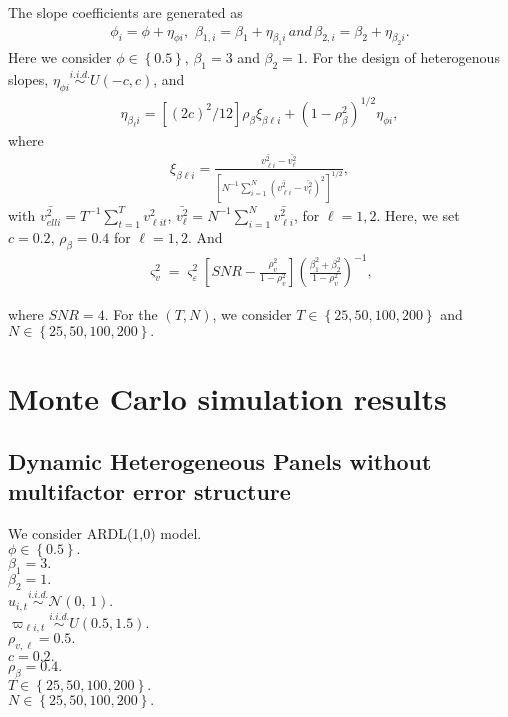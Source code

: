 \documentclass[12pt,a4paper,hyperref]{article}
\begin{document}
The slope coefficients are generated as
\begin{align}
\phi_{i}=\phi+\eta_{\phi i},\,\, \beta_{1,i}=\beta_{1}+\eta_{\beta_{1} i}\, and\, \beta_{2,i}=\beta_{2}+\eta_{\beta_{2}i}.
\end{align}
Here we consider $\phi \in \left\{0.5\right\}$, $\beta_{1}=3$ and $\beta_{2}=1$. For the design of heterogenous slopes, $\eta_{\phi i} \overset{i.i.d.}{\sim} U\left( -c, c\right)$, and
\begin{align}
\eta_{\beta_{\ell}i}=\left[(2c)^{2}/12 \right]\rho_{\beta}\xi_{\beta \ell i}+ \left(1-\rho^{2}_{\beta}  \right)^{1/2}\eta_{\phi i},
\end{align}
where
\begin{align}
\xi_{\beta \ell i}=\frac{\bar{v^{2}_{\ell i}}- \bar{v^{2}_{\ell}}}{\left[ N^{-1}\sum^{N}_{i=1} \left( \bar{v^{2}_{\ell i}}- \bar{v^{2}_{\ell }}\right)^{2} \right]^{1/2} },
\end{align}
with $\bar{v^{2}_{ell i}}=T^{-1}\sum^{T}_{t=1}v^{2}_{\ell i t}$, $\bar{v^{2}_{\ell}}=N^{-1} \sum^{N}_{i=1} \bar{v^{2}_{\ell i}}$, for $\ell=1,2.$
Here, we set $c=0.2,\, \rho_{\beta}=0.4$ for $\ell=1,2.$ And
\begin{align}
\varsigma^{2}_{v}=\varsigma^{2}_{\varepsilon}\left[SNR-\frac{\rho^{2}_{v}}{1-\rho^{2}_{v}}   \right]\left(\frac{\beta^{2}_{1}+\beta^{2}_{2}}{1-\rho^{2}_{v}}  \right)^{-1},
\end{align}

where $SNR=4$. For the $(T,N)$, we consider $T \in \left\{25, 50, 100, 200  \right\}$ and  $N \in \left\{25, 50, 100, 200  \right\}.$




\section{Monte Carlo simulation results}
\subsection{Dynamic Heterogeneous Panels without multifactor error structure }
We consider ARDL(1,0) model. \\
$\phi \in \left\{0.5 \right\}.$ \\
 $\beta_{1}=3.$ \\
  $\beta_{2}=1.$ \\
$u_{i,t}\overset{i.i.d.}{\sim} \mathcal{N}(0,\,1).$ \\
$\varpi_{\ell i,t} \overset{i.i.d.}{\sim} U(0.5, 1.5).$ \\
$\rho_{v, \ell}=0.5.$ \\
  $c=0.2.$ \\
  $ \rho_{\beta}=0.4.$ \\
 $T \in \left\{25, 50, 100, 200  \right\}.$ \\
 $N \in \left\{25, 50, 100, 200  \right\}.$ \\
\end{document}
